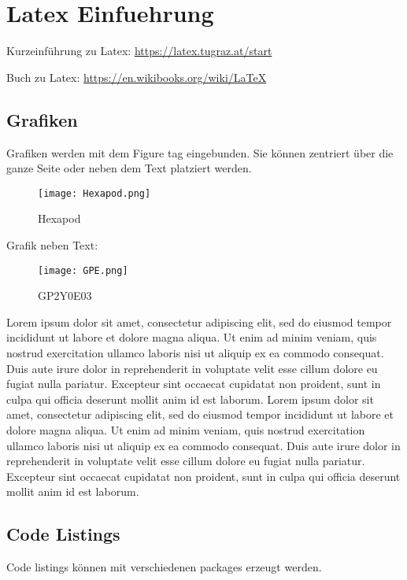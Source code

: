 \chapter{Latex Einfuehrung}

Kurzeinführung zu Latex: \url{https://latex.tugraz.at/start}

Buch zu Latex: \url{https://en.wikibooks.org/wiki/LaTeX}

\section{Grafiken}


Grafiken werden mit dem Figure tag eingebunden. Sie können zentriert über die ganze Seite oder neben dem Text platziert werden.

\begin{figure}[h]
\begin{center}
\texttt{[image: Hexapod.png]}
\caption{Hexapod}
\label{fig:hexapod}
\end{center}
\end{figure}

Grafik neben Text:

\begin{wrapfigure}{R}{0.5\linewidth}
\texttt{[image: GPE.png]}
\caption{GP2Y0E03 \cite{GP2Y0E03}}
\label{fig:GPE}
\end{wrapfigure}

Lorem ipsum dolor sit amet, consectetur adipiscing elit, sed do eiusmod tempor incididunt ut labore et dolore magna aliqua. Ut enim ad minim veniam, quis nostrud exercitation ullamco laboris nisi ut aliquip ex ea commodo consequat. Duis aute irure dolor in reprehenderit in voluptate velit esse cillum dolore eu fugiat nulla pariatur. Excepteur sint occaecat cupidatat non proident, sunt in culpa qui officia deserunt mollit anim id est laborum. 
Lorem ipsum dolor sit amet, consectetur adipiscing elit, sed do eiusmod tempor incididunt ut labore et dolore magna aliqua. Ut enim ad minim veniam, quis nostrud exercitation ullamco laboris nisi ut aliquip ex ea commodo consequat. Duis aute irure dolor in reprehenderit in voluptate velit esse cillum dolore eu fugiat nulla pariatur. Excepteur sint occaecat cupidatat non proident, sunt in culpa qui officia deserunt mollit anim id est laborum. 


\section{Code Listings}
Code listings können mit verschiedenen packages erzeugt werden.

